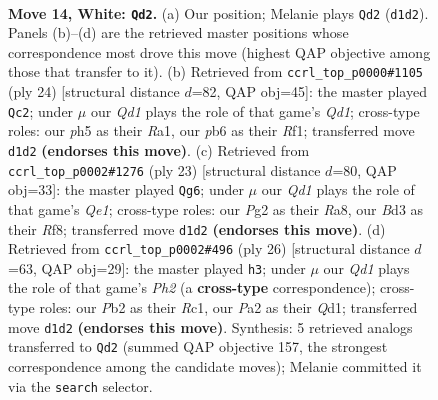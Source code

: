 \documentclass[11pt]{article}
\begin{document}
\clearpage

\begin{figure}[p]\centering
\begin{subfigure}{0.46\textwidth}\centering
\resizebox{\linewidth}{!}{%
\newchessgame
\chessboard[
  setfen={rnbq1rk1/5p2/1p2pnp1/3p3p/p2P4/2NB1NP1/PPP2PP1/2RQRK2 w - - 0 14},
  showmover=false,
  pgfstyle=straightmove, color=movearrow, markmove={d1-d2}
]}
\caption{}
\end{subfigure}\hfill
\begin{subfigure}{0.46\textwidth}\centering
\resizebox{\linewidth}{!}{%
\newchessgame
\chessboard[
  setfen={rnb1r1k1/pp2qp1p/3p1np1/2pP4/2P5/2NBPN1P/PP4P1/R2Q1RK1 w - - 1 13},
  showmover=false,
  pgfstyle=straightmove, color=movearrow, markmove={d1-c2}
]}
\caption{}
\end{subfigure}
\\[4pt]
\begin{subfigure}{0.46\textwidth}\centering
\resizebox{\linewidth}{!}{%
\newchessgame
\chessboard[
  setfen={r3qrk1/pp2b1pp/2npp3/2p1p3/1P2P3/P1PP1N2/5PPP/R1BQ1RK1 b - - 0 12},
  showmover=false,
  pgfstyle=straightmove, color=movearrow, markmove={e8-g6}
]}
\caption{}
\end{subfigure}\hfill
\begin{subfigure}{0.46\textwidth}\centering
\resizebox{\linewidth}{!}{%
\newchessgame
\chessboard[
  setfen={rn3rk1/pb2qppp/1p3n2/2pp4/3P4/2NBPN2/PP3PPP/2RQ1RK1 w - - 0 14},
  showmover=false,
  pgfstyle=straightmove, color=movearrow, markmove={h2-h3}
]}
\caption{}
\end{subfigure}
\caption{\textbf{Move 14, White: \texttt{Qd2}.} (a) Our position; Melanie plays \texttt{Qd2} (\texttt{d1d2}). Panels (b)--(d) are the retrieved master positions whose correspondence most drove this move (highest QAP objective among those that transfer to it). (b) Retrieved from \texttt{ccrl\_top\_p0000\#1105} (ply 24) [structural distance $d$=82, QAP obj=45]: the master played \texttt{Qc2}; under $\mu$ our \emph{Qd1} plays the role of that game's \emph{Qd1}; cross-type roles: our \emph{p}h5 as their \emph{R}a1, our \emph{p}b6 as their \emph{R}f1; transferred move \texttt{d1d2} \textbf{(endorses this move)}. (c) Retrieved from \texttt{ccrl\_top\_p0002\#1276} (ply 23) [structural distance $d$=80, QAP obj=33]: the master played \texttt{Qg6}; under $\mu$ our \emph{Qd1} plays the role of that game's \emph{Qe1}; cross-type roles: our \emph{P}g2 as their \emph{R}a8, our \emph{B}d3 as their \emph{R}f8; transferred move \texttt{d1d2} \textbf{(endorses this move)}. (d) Retrieved from \texttt{ccrl\_top\_p0002\#496} (ply 26) [structural distance $d$=63, QAP obj=29]: the master played \texttt{h3}; under $\mu$ our \emph{Qd1} plays the role of that game's \emph{Ph2} (a \textbf{cross-type} correspondence); cross-type roles: our \emph{P}b2 as their \emph{R}c1, our \emph{P}a2 as their \emph{Q}d1; transferred move \texttt{d1d2} \textbf{(endorses this move)}. Synthesis: 5 retrieved analogs transferred to \texttt{Qd2} (summed QAP objective 157, the strongest correspondence among the candidate moves); Melanie committed it via the \texttt{search} selector.}
\label{fig:thought-m26}
\end{figure}
\end{document}
